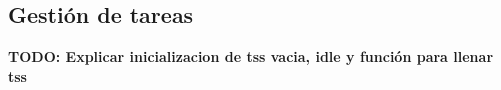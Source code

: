 \subsection{Gestión de tareas}


{\LARGE \textbf{TODO: Explicar inicializacion de tss vacia, idle y función para llenar tss}}